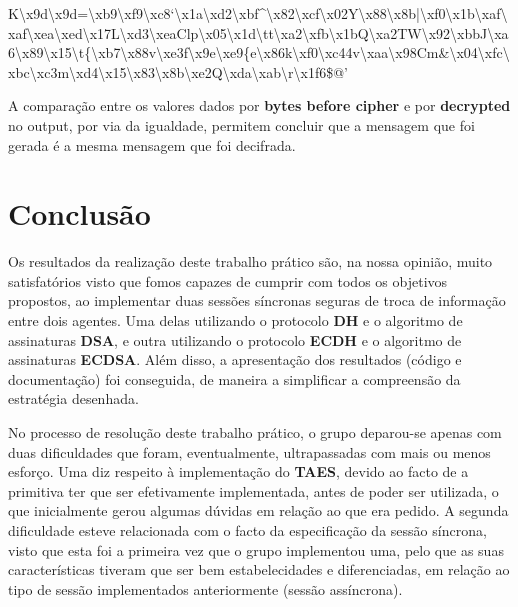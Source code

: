 \documentclass[11pt]{article}
\begin{document}
K\textbackslash{}x9d\textbackslash{}x9d=\textbackslash{}xb9\textbackslash{}xf9\textbackslash{}xc8`\textbackslash{}x1a\textbackslash{}xd2\textbackslash{}xbf\^{}\textbackslash{}x82\textbackslash{}xcf\textbackslash{}x02Y\textbackslash{}x88\textbackslash{}x8b|\textbackslash{}xf0\textbackslash{}x1b\textbackslash{}xaf\textbackslash{}xaf\textbackslash{}xea\textbackslash{}xed\textbackslash{}x17L\textbackslash{}xd3\textbackslash{}xeaClp\textbackslash{}x05\textbackslash{}x1d\textbackslash{}tt\textbackslash{}xa2\textbackslash{}xfb\textbackslash{}x1bQ\textbackslash{}xa2TW\textbackslash{}x92\textbackslash{}xbbJ\textbackslash{}xa6\textbackslash{}x89\textbackslash{}x15\textbackslash{}t\{\textbackslash{}xb7\textbackslash{}x88v\textbackslash{}xe3f\textbackslash{}x9e\textbackslash{}xe9\{e\textbackslash{}x86k\textbackslash{}xf0\textbackslash{}xc44v\textbackslash{}xaa\textbackslash{}x98Cm\&\textbackslash{}x04\textbackslash{}xfc\textbackslash{}xbc\textbackslash{}xc3m\textbackslash{}xd4\textbackslash{}x15\textbackslash{}x83\textbackslash{}x8b\textbackslash{}xe2Q\textbackslash{}xda\textbackslash{}xab\textbackslash{}r\textbackslash{}x1f6\$@'

    A comparação entre os valores dados por \textbf{bytes before cipher} e
por \textbf{decrypted} no output, por via da igualdade, permitem
concluir que a mensagem que foi gerada é a mesma mensagem que foi
decifrada.

    \hypertarget{conclusuxe3o}{%
\section{Conclusão}\label{conclusuxe3o}}

    Os resultados da realização deste trabalho prático são, na nossa
opinião, muito satisfatórios visto que fomos capazes de cumprir com
todos os objetivos propostos, ao implementar duas sessões síncronas
seguras de troca de informação entre dois agentes. Uma delas utilizando o protocolo
\textbf{DH} e o algoritmo de assinaturas \textbf{DSA}, e outra utilizando
o protocolo \textbf{ECDH} e o algoritmo de assinaturas \textbf{ECDSA}.
Além disso, a apresentação dos resultados (código e documentação) foi conseguida, de maneira a simplificar a compreensão da estratégia
desenhada.

No processo de resolução deste trabalho prático, o grupo deparou-se
apenas com duas dificuldades que foram, eventualmente, ultrapassadas com
mais ou menos esforço. Uma diz respeito à implementação do
\textbf{TAES}, devido ao facto de a primitiva ter que ser efetivamente
implementada, antes de poder ser utilizada, o que inicialmente gerou algumas
dúvidas em relação ao que era pedido. A segunda dificuldade esteve
relacionada com o facto da especificação da sessão síncrona, visto que
esta foi a primeira vez que o grupo implementou uma, pelo que
as suas características tiveram que ser bem
estabelecidades e diferenciadas, em relação ao tipo de sessão implementados anteriormente
 (sessão assíncrona).
\end{document}
